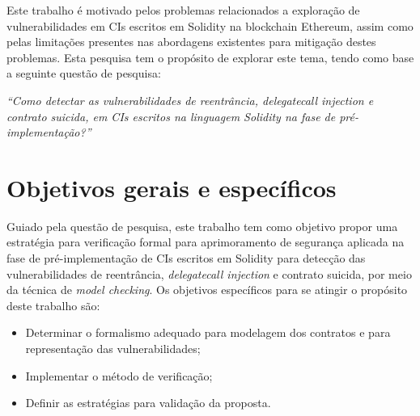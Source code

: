 Este trabalho é motivado pelos problemas relacionados a exploração de vulnerabilidades em CIs escritos em Solidity na blockchain Ethereum, assim como pelas limitações presentes nas abordagens existentes para mitigação destes problemas. Esta pesquisa tem o propósito de explorar este tema, tendo como base a seguinte questão de pesquisa:

\textit{``Como detectar as vulnerabilidades de reentrância, \textit{delegatecall injection} e contrato suicida, em CIs escritos na linguagem Solidity na fase de pré-implementação?''}






\section{Objetivos gerais e específicos}

Guiado pela questão de pesquisa, este trabalho tem como objetivo propor uma estratégia para verificação formal para aprimoramento de segurança aplicada na fase de pré-implementação de CIs escritos em Solidity para detecção das vulnerabilidades de reentrância, \textit{delegatecall injection} e contrato suicida, por meio da técnica de \textit{model checking}. Os objetivos específicos para se atingir o propósito deste trabalho são:
\begin{itemize}
    \item Determinar o formalismo adequado para modelagem dos contratos e para representação das vulnerabilidades;
    \item Implementar o método de verificação;
    \item Definir as estratégias para validação da proposta. 
\end{itemize}

